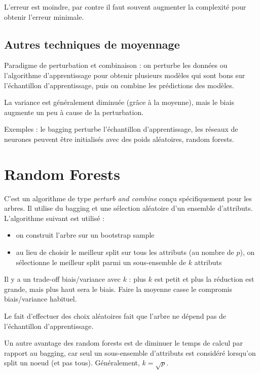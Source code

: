 	
	L'erreur est moindre, par contre il faut souvent augmenter la complexité pour obtenir l'erreur minimale.
	
	\subsection{Autres techniques de moyennage}
	
	Paradigme de perturbation et combinaison : on perturbe les données ou l'algorithme d'apprentissage pour obtenir plusieurs modèles qui sont bons sur l'échantillon d'apprentissage, puis on combine les prédictions des modèles.
	
	La variance est généralement diminuée (grâce à la moyenne), mais le biais augmente un peu à cause de la perturbation.
	
	Exemples : le bagging perturbe l'échantillon d'apprentissage, les réseaux de neurones peuvent être initialisés avec des poids aléatoires, random forests.
	
\section{Random Forests}

	C'est un algorithme de type \textit{perturb and combine} conçu spécifiquement pour les arbres. Il utilise du bagging et une sélection aléatoire d'un ensemble d'attributs. L'algorithme suivant est utilisé :
	
	\begin{itemize}
		\item on construit l'arbre sur un bootstrap sample
		\item au lieu de choisir le meilleur split sur tous les attributs (au nombre de $p$), on sélectionne le meilleur split parmi un sous-ensemble de $k$ attributs
	\end{itemize}
	
	Il y a un trade-off biais/variance avec $k$ : plus $k$ est petit et plus la réduction est grande, mais plus haut sera le biais. Faire la moyenne casse le compromis biais/variance habituel.
	
	Le fait d'effectuer des choix aléatoires fait que l'arbre ne dépend pas de l'échantillon d'apprentissage.
	
	
	Un autre avantage des random forests est de diminuer le temps de calcul par rapport au bagging, car seul un sous-ensemble d'attributs est considéré lorsqu'on split un noeud (et pas tous). Généralement, $k = \sqrt{p}$.
	
